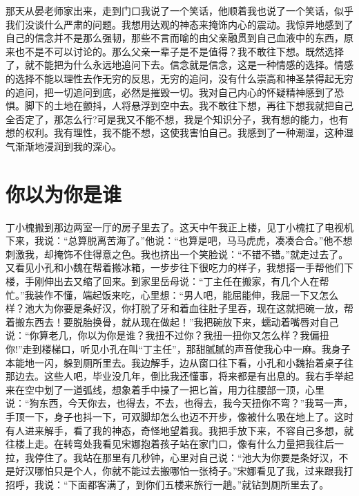 \documentclass[12pt,oneside]{book}
\begin{document}
那天从晏老师家出来，走到门口我说了一个笑话，他顺着我也说了一个笑话，似乎我们没谈什么严肃的问题。我想用达观的神态来掩饰内心的震动。我惊异地感到了自己的信念并不是那么强韧，那些不言而喻的由父亲融贯到自己血液中的东西，原来也不是不可以讨论的。那么父亲一辈子是不是值得？我不敢往下想。既然选择了，就不能把为什么永远地追问下去。信念就是信念，这是一种情感的选择。情感的选择不能以理性去作无穷的反思，无穷的追问，没有什么崇高和神圣禁得起无穷的追问，把一切追问到底，必然是摧毁一切。我对自己内心的怀疑精神感到了恐惧。脚下的土地在颤抖，人将悬浮到空中去。我不敢往下想，再往下想我就把自己全否定了，那怎么行?可是我又不能不想，我是个知识分子，我有想的能力，也有想的权利。我有理性，我不能不想，这使我害怕自己。我感到了一种潮湿，这种湿气渐渐地浸润到我的深心。


\chapter{你以为你是谁}

丁小槐搬到那边两室一厅的房子里去了。这天中午我正上楼，见丁小槐扛了电视机下来，我说：``总算脱离苦海了。''他说：``也算是吧，马马虎虎，凑凑合合。''他不想刺激我，却掩饰不住得意之色。我也挤出一个笑脸说：``不错不错。''就走过去了。又看见小孔和小魏在帮着搬冰箱，一步步往下很吃力的样子，我想搭一手帮他们下楼，手刚伸出去又缩了回来。到家里岳母说：``丁主任在搬家，有几个人在帮忙。''我装作不懂，端起饭来吃，心里想：``男人吧，能屈能伸，我屈一下又怎么样？池大为你要是条好汉，你打脱了牙和着血往肚子里吞，现在这就把碗一放，帮着搬东西去！要脱胎换骨，就从现在做起！''我把碗放下来，蠕动着嘴唇对自己说：``你算老几，你以为你是谁？我扭不过你？我扭一扭你又怎么样？我偏扭你!''走到楼梯口，听见小孔在叫``丁主任''，那甜腻腻的声音使我心中一麻。我身子本能地一闪，躲到厕所里去。我边解手，边从窗口往下看，小孔和小魏抬着桌子往那边去。这些人吧，毕业没几年，倒比我还懂事，将来都是有出息的。我右手举起来在空中划了一道弧线，想象着手中操了一把匕首，用力往腰部一顶，心里说：``狗东西，今天你去，也得去，不去，也得去，我今天扭你不弯？''我骂一声，手顶一下，身子也抖一下，可双脚却怎么也迈不开步，像被什么吸在地上了。这时有人进来解手，看了我的神态，奇怪地望着我。我把手放下来，不容自己多想，就往楼上走。在转弯处我看见宋娜抱着孩子站在家门口，像有什么力量把我往后一拉，我停住了。我站在那里有几秒钟，心里对自己说：``池大为你要是条好汉，不是好汉哪怕只是个人，你就不能过去搬哪怕一张椅子。''宋娜看见了我，过来跟我打招呼，我说：``下面都客满了，到你们五楼来旅行一趟。''就钻到厕所里去了。
\end{document}
